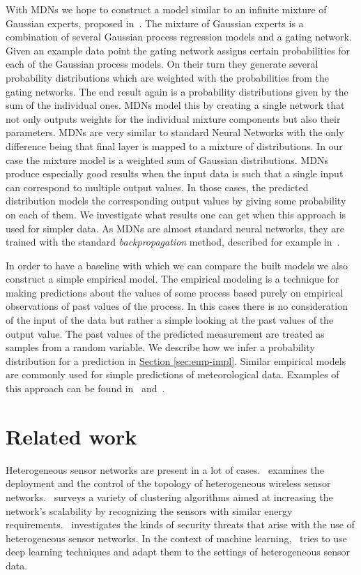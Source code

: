 \documentclass[12pt,a4paper,twoside]{scrartcl}
\numberwithin{equation}{section}
\newcommand{\refsec}[1]{\hyperref[#1]{Section \ref*{#1}}}
\begin{document}
With MDNs we hope to construct a model similar to an infinite mixture of Gaussian experts, proposed in~\cite{rasmussen2002}. The mixture of Gaussian experts is a combination of several Gaussian process regression models and a gating network. Given an example data point the gating network assigns certain probabilities for each of the Gaussian process models. On their turn they generate several probability distributions which are weighted with the probabilities from the gating networks. The end result again is a probability distributions given by the sum of the individual ones. MDNs model this by creating a single network that not only outputs weights for the individual mixture components but also their parameters. MDNs are very similar to standard Neural Networks with the only difference being that final layer is mapped to a mixture of distributions. In our case the mixture model is a weighted sum of Gaussian distributions. MDNs produce especially good results when the input data is such that a single input can correspond to multiple output values. In those cases, the predicted distribution models the corresponding output values by giving some probability on each of them. We investigate what results one can get when this approach is used for simpler data. As MDNs are almost standard neural networks, they are trained with the standard \emph{backpropagation} method, described for example in~\cite{bertels2001}.

In order to have a baseline with which we can compare the built models we also construct a simple empirical model. The empirical modeling is a technique for making predictions about the values of some process based purely on empirical observations of past values of the process. In this cases there is no consideration of the input of the data but rather a simple looking at the past values of the output value. The past values of the predicted measurement are treated as samples from a random variable. We describe how we infer a probability distribution for a prediction in \refsec{sec:emp-impl}. Similar empirical models are commonly used for simple predictions of meteorological data. Examples of this approach can be found in~\cite{krueger2011} and~\cite{eden2015}.
\clearpage
\section{Related work}\label{sec:related-work}
Heterogeneous sensor networks are present in a lot of cases.~\cite{wu2007} examines the deployment and the control of the topology of heterogeneous wireless sensor networks.~\cite{katiyar2010} surveys a variety of clustering algorithms aimed at increasing the network's scalability by recognizing the sensors with similar energy requirements.~\cite{uplap2014} investigates the kinds of security threats that arise with the use of heterogeneous sensor networks. In the context of machine learning,~\cite{liu2017} tries to use deep learning techniques and adapt them to the settings of heterogeneous sensor data.
\end{document}
